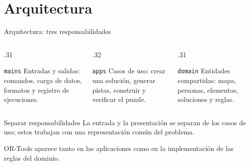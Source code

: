 \documentclass[aspectratio=169,11pt]{beamer}
\begin{document}
\section{Arquitectura}

\begin{frame}{Arquitectura: tres responsabilidades}
  \begin{columns}[T,onlytextwidth]
    \begin{column}{.31\textwidth}
      \begin{block}{\texttt{mains}}
        \small Entradas y salidas: comandos, carga de datos,
        formatos y registro de ejecuciones.
      \end{block}
    \end{column}
    \begin{column}{.32\textwidth}
      \begin{block}{\texttt{apps}}
        \small Casos de uso: crear una soluci\'on, generar pistas,
        construir y verificar el puzzle.
      \end{block}
    \end{column}
    \begin{column}{.31\textwidth}
      \begin{block}{\texttt{domain}}
        \small Entidades compartidas: mapa, personas, elementos,
        soluciones y reglas.
      \end{block}
    \end{column}
  \end{columns}
  \vspace{4mm}
  \begin{exampleblock}{Separar responsabilidades}
    La entrada y la presentaci\'on se separan de los casos de uso;
    estos trabajan con una representaci\'on com\'un del problema.
  \end{exampleblock}
  \small OR-Tools aparece tanto en las aplicaciones como en la
  implementaci\'on de las reglas del dominio.
\end{frame}
\end{document}
